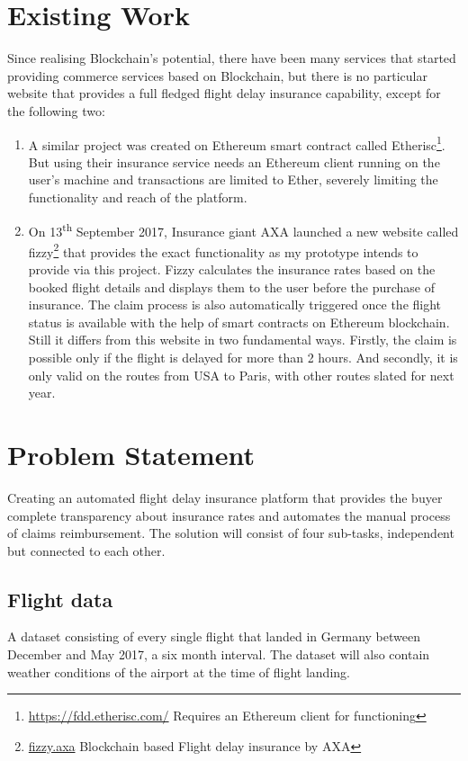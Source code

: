 \section{Existing Work}
Since realising Blockchain's potential, there have been many services that started providing commerce services based on Blockchain, but there is no particular website that provides a full fledged flight delay insurance capability, except for the following two:
\begin{enumerate}
    \item A similar project was created on Ethereum smart contract called Etherisc\footnote{\url{https://fdd.etherisc.com/} Requires an Ethereum client for functioning}. But using their insurance service needs an Ethereum client running on the user's machine and transactions are limited to Ether, severely limiting the functionality and reach of the platform.
    \item On 13\textsuperscript{th} September 2017, Insurance giant AXA launched a new website called fizzy\footnote{\url{fizzy.axa} Blockchain based Flight delay insurance by AXA} that provides the exact functionality as my prototype intends to provide via this project. Fizzy calculates the insurance rates based on the booked flight details and displays them to the user before the purchase of insurance. The claim process is also automatically triggered once the flight status is available with the help of smart contracts on Ethereum blockchain. Still it differs from this website in two fundamental ways. Firstly, the claim is possible only if the flight is delayed for more than 2 hours. And secondly, it is only valid on the routes from USA to Paris, with other routes slated for next year. \cite{AXAFizzy}
\end{enumerate}

\section{Problem Statement}
Creating an automated flight delay insurance platform that provides the buyer complete transparency about insurance rates and automates the manual process of claims reimbursement. The solution will consist of four sub-tasks, independent but connected to each other.
    \subsection{Flight data}
    A dataset consisting of every single flight that landed in Germany between December and May 2017, a six month interval. The dataset will also contain weather conditions of the airport at the time of flight landing.
